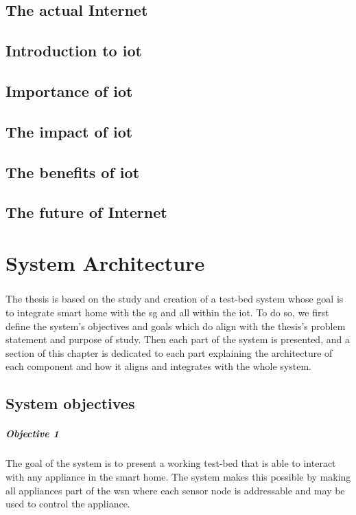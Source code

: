 \documentclass[oneside,12pt,a4paper,final]{book}
\begin{document}
\section{The actual Internet}
\section{Introduction to \gls{iot}}
\section{Importance of \gls{iot}}
\section{The impact of \gls{iot}}
\section{The benefits of \gls{iot}}
\section{The future of Internet}


\chapter{System Architecture}
\paragraph{}
The thesis is based on the study and creation of a test-bed system whose goal is to integrate smart home with the \gls{sg} and all within the \gls{iot}. To do so, we first define the system's objectives and goals which do align  with the thesis's problem statement and purpose of study. Then each part of the system is presented, and a section of this chapter is dedicated to each part explaining the architecture of each component and how it aligns and integrates with the whole system.
\section{System objectives}
\paragraph{Objective 1}
The goal of the system is to present a working test-bed that is able to interact with any appliance in the smart home. The system makes this possible by making all appliances part of the \gls{wsn} where each sensor node is addressable and may be used to control the appliance.
\end{document}
